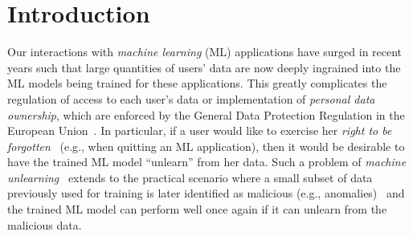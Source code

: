 \documentclass{article}
\theoremstyle{definition}
\begin{document}
\section{Introduction}
\label{sec:intro}
Our interactions with \emph{machine learning} (ML) applications have surged in recent years 
such that large quantities of users' data are now deeply ingrained into the ML models being trained for these applications.
This greatly complicates the regulation of access to each user's data or implementation of  \emph{personal data ownership}, which are enforced by the General Data Protection Regulation in the European Union~\cite{mantelero2013eu}.
In particular, 
if a user would like to exercise her \emph{right to be forgotten}~\cite{mantelero2013eu} (e.g., when quitting an ML application),
then it would be desirable to have the trained ML model  ``unlearn'' from her data.
Such a problem of \emph{machine unlearning}~\cite{cao2015towards} extends to the practical scenario where a small subset of data previously used for training is later identified as malicious (e.g., anomalies)~\cite{cao2015towards,du2019lifelong} and the trained ML model can perform well once again if it can unlearn from the malicious data.
\end{document}
